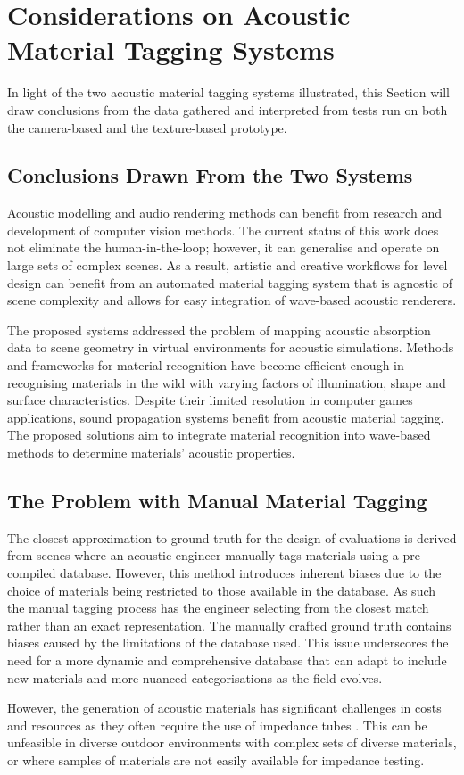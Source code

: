 \section{Considerations on Acoustic Material Tagging Systems}
In light of the two acoustic material tagging systems illustrated, this Section will draw conclusions from the data gathered and interpreted from tests run on both the camera-based and the texture-based prototype.

\subsection{Conclusions  Drawn From the Two Systems}
Acoustic modelling and audio rendering methods can benefit from research and development of computer vision methods. 
The current status of this work does not eliminate the human-in-the-loop; however, it can generalise and operate on large sets of complex scenes. As a result, artistic and creative workflows for level design can benefit from an automated material tagging system that is agnostic of scene complexity and allows for easy integration of wave-based acoustic renderers.

The proposed systems addressed the problem of mapping acoustic absorption data to scene geometry in virtual environments for acoustic simulations. Methods and frameworks for material recognition have become efficient enough in recognising materials in the wild with varying factors of illumination, shape and surface characteristics. Despite their limited resolution in computer games applications, sound propagation systems benefit from acoustic material tagging. The proposed solutions aim to integrate material recognition into wave-based methods to determine materials' acoustic properties.


\subsection{The Problem with Manual Material Tagging}
The closest approximation to ground truth for the design of evaluations is derived from scenes where an acoustic engineer manually tags materials using a pre-compiled database. However, this method introduces inherent biases due to the choice of materials being restricted to those available in the database. As such the manual tagging process has the engineer selecting from the closest match rather than an exact representation. The manually crafted ground truth contains biases caused by the limitations of the database used. This issue underscores the need for a more dynamic and comprehensive database that can adapt to include new materials and more nuanced categorisations as the field evolves.\par
However, the generation of acoustic materials has significant challenges in costs and resources as they often require the use of impedance tubes \citep{jones1997comparison}. This can be unfeasible in diverse outdoor environments with complex sets of diverse materials, or where samples of materials are not easily available for impedance testing.

